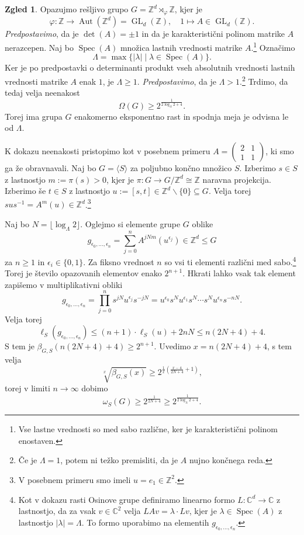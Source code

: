 \documentclass[11pt]{book}
\def\ZZ{\mathbb{Z}}
\def\CC{\mathbb{C}}
\DeclareMathOperator\Spec{Spec}
\DeclareMathOperator\Aut{Aut}
\DeclareMathOperator\GL{GL}
\theoremstyle{definition}
\theoremstyle{zgled}
\newtheorem*{zgled}{Zgled}
\theoremstyle{odprtproblem}
\theoremstyle{domacanaloga}
\theoremstyle{izrek}
\begin{document}
\begin{zgled}
Opazujmo rešljivo grupo $G = \ZZ^d \rtimes_\varphi \ZZ$, kjer je
\[
\varphi \colon \ZZ \to \Aut(\ZZ^d) = \GL_d(\ZZ),
\quad
1 \mapsto A \in \GL_d(\ZZ).
\]
{\em Predpostavimo}, da je $\det(A) = \pm 1$ in da je karakteristični polinom matrike $A$ nerazcepen. Naj bo $\Spec(A)$ množica lastnih vrednosti matrike $A$.\footnote{Vse lastne vrednosti so med sabo različne, ker je karakteristični polinom enostaven.} Označimo
\[
\Lambda = \max \{ |\lambda| \mid \lambda \in \Spec(A) \}.
\]
Ker je po predpostavki o determinanti produkt vseh absolutnih vrednosti lastnih vrednosti matrike $A$ enak $1$, je $\Lambda \geq 1$. {\em Predpostavimo}, da je $\Lambda > 1$.\footnote{Če je $\Lambda = 1$, potem ni težko premisliti, da je $A$ nujno končnega reda.} Trdimo, da tedaj velja neenakost
\[
\Omega(G) \geq 2^{\frac{1}{2 \log_\Lambda 2 + 4}}.
\]
Torej ima grupa $G$ enakomerno eksponentno rast in spodnja meja je odvisna le od $\Lambda$.

K dokazu neenakosti pristopimo kot v posebnem primeru $A = \left( \begin{smallmatrix} 2 & 1 \\ 1 & 1 \end{smallmatrix} \right)$, ki smo ga že obravnavali. Naj bo $G = \langle S \rangle$ za poljubno končno množico $S$. Izberimo $s \in S$ z lastnostjo $m := \pi(s) > 0$, kjer je $\pi \colon G \to G/\ZZ^d \cong \ZZ$ naravna projekcija. Izberimo še $t \in S$ z lastnostjo $u := [s,t] \in \ZZ^d \backslash \{ 0 \} \subseteq G$. Velja torej $s u s^{-1} = A^m(u) \in \ZZ^d$.\footnote{V posebnem primeru smo imeli $u = e_1 \in \ZZ^2$.}

Naj bo $N = \lfloor \log_\Lambda 2 \rfloor$. Oglejmo si elemente grupe $G$ oblike
\[
g_{\epsilon_0, \dots, \epsilon_n} = \sum_{j = 0}^n A^{jNm}(u^{\epsilon_j}) \in \ZZ^d \leq G
\]
za $n \geq 1$ in $\epsilon_i \in \{0,1\}$. Za fiksno vrednost $n$ so vsi ti elementi različni med sabo.\footnote{Kot v dokazu rasti Osinove grupe definiramo linearno formo $L \colon \CC^d \to \CC$ z lastnostjo, da za vsak $v \in \CC^2$ velja $LAv = \lambda \cdot Lv$, kjer je $\lambda \in \Spec(A)$ z lastnostjo $|\lambda| = \Lambda$. To formo uporabimo na elementih $g_{\epsilon_0, \dots, \epsilon_n}$.} Torej je število opazovanih elementov enako $2^{n+1}$. Hkrati lahko vsak tak element zapišemo v multiplikativni obliki
\[
g_{\epsilon_0, \dots, \epsilon_n} = \prod_{j = 0}^n s^{jN} u^{\epsilon_j} s^{-jN}
= u^{\epsilon_0} s^N u^{\epsilon_1} s^N \cdots s^N u^{\epsilon_n} s^{-nN}.
\]
Velja torej
\[
\ell_S(g_{\epsilon_0, \dots, \epsilon_n}) \leq (n+1) \cdot \ell_S(u) + 2 n N
\leq n (2N + 4) + 4.
\]
S tem je $\beta_{G,S}(n(2N + 4) + 4) \geq 2^{n+1}$. Uvedimo $x = n(2N + 4) + 4$, s tem velja
\[
\sqrt[x]{\beta_{G,S}(x)} \geq 2^{\frac{1}{x} \left( \frac{x - 4}{2N + 4} + 1 \right)},
\]
torej v limiti $n \to \infty$ dobimo
\[
\omega_S(G) \geq 2^{\frac{1}{2N+4}} \geq 2^{\frac{1}{2 \log_\Lambda 2 + 4}}.
\]
\end{zgled}
\end{document}
